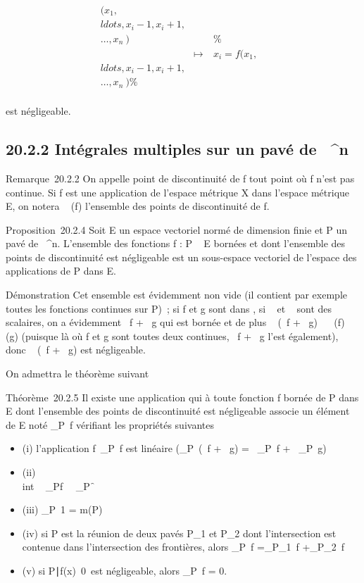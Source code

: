 \documentclass[]{article}
\begin{document}
\begin{align*}
(x_1,\\ldots,x_i-1,x_i+1,\\\ldots,x_n~)&&
\%& \\ & \mapsto~&
x_i =
f(x_1,\\ldots,x_i-1,x_i+1,\\\ldots,x_n~)\%&
\\ \end{align*}

est négligeable.

\subsection{20.2.2 Intégrales multiples sur un pavé de ~^n}

Remarque~20.2.2 On appelle point de discontinuité de f tout point où f
n'est pas continue. Si f est une application de l'espace métrique X dans
l'espace métrique E, on notera
\mathrmDisc~ (f) l'ensemble
des points de discontinuité de f.

Proposition~20.2.4 Soit E un espace vectoriel normé de dimension finie
et P un pavé de ~^n. L'ensemble  des fonctions f : P \rightarrow~ E
bornées et dont l'ensemble des points de discontinuité est négligeable
est un sous-espace vectoriel de l'espace des applications de P dans E.

Démonstration Cet ensemble est évidemment non vide (il contient par
exemple toutes les fonctions continues sur P)~; si f et g sont dans ,
si \alpha~ et \beta~ sont des scalaires, on a évidemment \alpha~f + \beta~g qui est bornée et
de plus \mathrmDisc~ (\alpha~f +
\beta~g) \subset~\mathrmDisc~ (f)
\cup\mathrmDisc~ (g) (puisque
là où f et g sont toutes deux continues, \alpha~f + \beta~g l'est également), donc
\mathrmDisc~ (\alpha~f + \beta~g) est
négligeable.

On admettra le théorème suivant

Théorème~20.2.5 Il existe une application qui à toute fonction f bornée
de P dans E dont l'ensemble des points de discontinuité est négligeable
associe un élément de E noté \int  _P~f
vérifiant les propriétés suivantes

\begin{itemize}
\itemsep1pt\parskip0pt
\item
  (i) l'application
  f\mapsto~\int  _P~f
  est linéaire (\int  _P~(\alpha~f + \beta~g) =
  \alpha~\int  _P~f +
  \beta~\int  _P~g)
\item
  (ii) \\int ~
  _Pf\ \leq\int ~
  _P\f\
\item
  (iii) \int  _P~1 = m(P)
\item
  (iv) si P est la réunion de deux pavés P_1 et P_2
  dont l'intersection est contenue dans l'intersection des frontières,
  alors \int  _P~f
  =\int  _P_1~f
  +\int  _P_2~f
\item
  (v) si \x \in
  P∣f(x)\mathrel\neq~0\
  est négligeable, alors \int  _P~f = 0.
\end{itemize}
\end{document}

